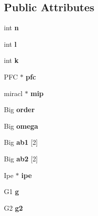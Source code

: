 \subsection*{Public Attributes}
\begin{DoxyCompactItemize}
\item 
int {\bfseries n}\hypertarget{classIpdb_a8359e860242c394a701b39e50e61dc52}{}\label{classIpdb_a8359e860242c394a701b39e50e61dc52}

\item 
int {\bfseries l}\hypertarget{classIpdb_ac188ad7b6f7bb9d590501d633a546552}{}\label{classIpdb_ac188ad7b6f7bb9d590501d633a546552}

\item 
int {\bfseries k}\hypertarget{classIpdb_abd041d0cb75530f5f5619348899d6117}{}\label{classIpdb_abd041d0cb75530f5f5619348899d6117}

\item 
P\+FC $\ast$ {\bfseries pfc}\hypertarget{classIpdb_af1311e917bef9cf02a8f2e13ae2f872d}{}\label{classIpdb_af1311e917bef9cf02a8f2e13ae2f872d}

\item 
miracl $\ast$ {\bfseries mip}\hypertarget{classIpdb_a1c882734071e75895cc886d3045b9dbb}{}\label{classIpdb_a1c882734071e75895cc886d3045b9dbb}

\item 
Big {\bfseries order}\hypertarget{classIpdb_a6af3d4046ab1e46b61005fd8273e8276}{}\label{classIpdb_a6af3d4046ab1e46b61005fd8273e8276}

\item 
Big {\bfseries omega}\hypertarget{classIpdb_a77d39c78f7fc859e11c434261fa5398b}{}\label{classIpdb_a77d39c78f7fc859e11c434261fa5398b}

\item 
Big {\bfseries ab1} \mbox{[}2\mbox{]}\hypertarget{classIpdb_a749f1da0f3061da1f2979ea163700a7b}{}\label{classIpdb_a749f1da0f3061da1f2979ea163700a7b}

\item 
Big {\bfseries ab2} \mbox{[}2\mbox{]}\hypertarget{classIpdb_ac652d64e8a525c6ff42d92c764d18c30}{}\label{classIpdb_ac652d64e8a525c6ff42d92c764d18c30}

\item 
Ipe $\ast$ {\bfseries ipe}\hypertarget{classIpdb_a29e7eee08acde4fd33de519b27def09c}{}\label{classIpdb_a29e7eee08acde4fd33de519b27def09c}

\item 
G1 {\bfseries g}\hypertarget{classIpdb_aef14479818fde911d8c71be2333f72f5}{}\label{classIpdb_aef14479818fde911d8c71be2333f72f5}

\item 
G2 {\bfseries g2}\hypertarget{classIpdb_a9ccba97ad1c9c35d93ab4f94a2c8f5c8}{}\label{classIpdb_a9ccba97ad1c9c35d93ab4f94a2c8f5c8}

\end{DoxyCompactItemize}


